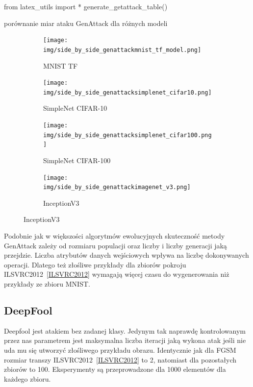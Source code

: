 \documentclass[
    left=2.5cm,         %
    right=2.5cm,        %
    top=2.5cm,          %
    bottom=3cm,         %
    bindingoffset=6mm,  %
    nohyphenation=false %
]{eiti/eiti-thesis}
\begin{document}
\begin{table}[h]
\begin{adjustbox}{max width=\textwidth}
\begin{pycode}
from latex_utils import *
generate_getattack_table()
\end{pycode}
\end{adjustbox}
\caption{porównanie miar ataku GenAttack dla różnych modeli}
\end{table}

\begin{figure}[H]
    \caption{Przykłady wygenerowanych złośliwych przykładów z zadaną klasą za pomocą metody GenAttack}

    \begin{subfigure}[t]{0.48\textwidth}
        \texttt{[image: img/side\_by\_side\_genattackmnist\_tf\_model.png]}
        \caption{MNIST TF}
        \label{fig:mnist_side_genattack}
    \end{subfigure}%
    \hfill
    \begin{subfigure}[t]{0.48\textwidth}
        \texttt{[image: img/side\_by\_side\_genattacksimplenet\_cifar10.png]}
        \caption{SimpleNet CIFAR-10}
        \label{fig:cifar10_side_genattack}
    \end{subfigure}%

    \begin{subfigure}[t]{0.48\textwidth}
        \texttt{[image: img/side\_by\_side\_genattacksimplenet\_cifar100.png]}
        \caption{SimpleNet CIFAR-100}
        \label{fig:cifar100_side_genattack}
    \end{subfigure}%
    \hfill
    \begin{subfigure}[t]{0.48\textwidth}
        \texttt{[image: img/side\_by\_side\_genattackimagenet\_v3.png]}
        \caption{InceptionV3}
        \label{fig:imagenet_side_genattack}
    \end{subfigure}%

\end{figure}



Podobnie jak w większości algorytmów ewolucyjnych skuteczność metody GenAttack zależy od rozmiaru populacji oraz liczby
i liczby generacji jaką przejdzie. Liczba atrybutów danych wejściowych wpływa na liczbę dokonywanych operacji. Dlatego też złośliwe przykłady dla zbiorów pokroju
ILSVRC2012~\ref{ILSVRC2012} wymagają więcej czasu do wygenerowania niż przykłady ze zbioru MNIST.

\subsection{DeepFool}
Deepfool jest atakiem bez zadanej klasy. Jedynym tak naprawdę kontrolowanym przez nas parametrem jest maksymalna
liczba iteracji jaką wykona atak jeśli nie uda mu się utworzyć złośliwego przykładu obrazu. Identycznie jak dla FGSM rozmiar transzy ILSVRC2012~\ref{ILSVRC2012} to 2, natomiast dla pozostałych zbiorów to 100.
Eksperymenty są przeprowadzone dla 1000 elementów dla każdego zbioru.
\end{document}
